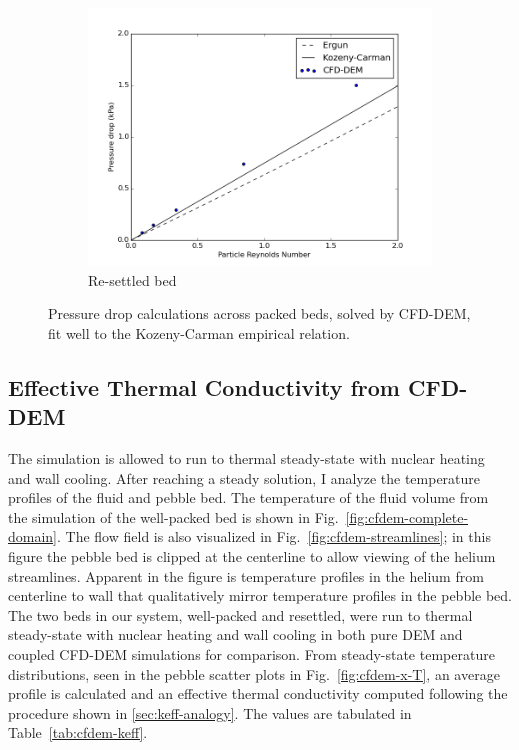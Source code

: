 \begin{figure}
        \begin{subfigure}[b]{0.7\textwidth}
                \includegraphics[width=\textwidth]{figures/pressureDrops-evap.png}
                \caption{Re-settled bed}
                \label{fig:pressure-drop-evap}
        \end{subfigure}
        \caption{Pressure drop calculations across packed beds, solved by CFD-DEM, fit well to the Kozeny-Carman empirical relation.}\label{fig:cfdem-pressure-drop}
\end{figure}



\subsection{Effective Thermal Conductivity from CFD-DEM}\label{sec:cfd-dem-effective-conductivity}

The simulation is allowed to run to thermal steady-state with nuclear heating and wall cooling. After reaching a steady solution, I analyze the temperature profiles of the fluid and pebble bed. The temperature of the fluid volume from the simulation of the well-packed bed is shown in Fig.~\ref{fig:cfdem-complete-domain}. The flow field is also visualized in Fig.~\ref{fig:cfdem-streamlines}; in this figure the pebble bed is clipped at the centerline to allow viewing of the helium streamlines. Apparent in the figure is temperature profiles in the helium from centerline to wall that qualitatively mirror temperature profiles in the pebble bed. The two beds in our system, well-packed and resettled, were run to thermal steady-state with nuclear heating and wall cooling in both pure DEM and coupled CFD-DEM simulations for comparison. From steady-state temperature distributions, seen in the pebble scatter plots in Fig.~\ref{fig:cfdem-x-T}, an average profile is calculated and an effective thermal conductivity computed following the procedure shown in \cref{sec:keff-analogy}. The values are tabulated in Table~\ref{tab:cfdem-keff}. 

